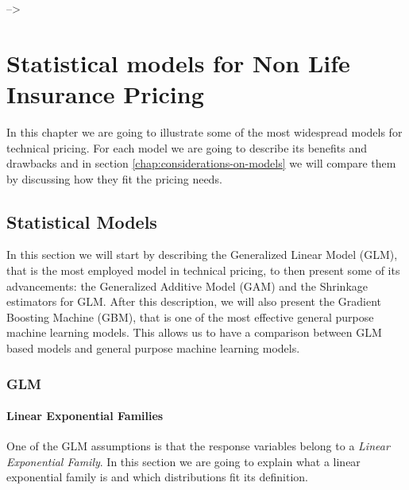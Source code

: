 \documentclass[a4paper, nobind]{templates/ociamthesis}
\theoremstyle{definition}
\theoremstyle{definition}
\theoremstyle{definition}
\theoremstyle{remark}
\begin{document}
--\textgreater{}

\hypertarget{chap:models}{%
\chapter{\texorpdfstring{\textbf{Statistical models for Non Life Insurance Pricing}}{Statistical models for Non Life Insurance Pricing}}\label{chap:models}}

\minitoc  


In this chapter we are going to illustrate some of the most widespread models for technical pricing. For each model we are going to describe its benefits and drawbacks and in section \ref{chap:considerations-on-models} we will compare them by discussing how they fit the pricing needs.

\hypertarget{statistical-models}{%
\section{Statistical Models}\label{statistical-models}}

In this section we will start by describing the Generalized Linear Model (GLM), that is the most employed model in technical pricing, to then present some of its advancements: the Generalized Additive Model (GAM) and the Shrinkage estimators for GLM. After this description, we will also present the Gradient Boosting Machine (GBM), that is one of the most effective general purpose machine learning models. This allows us to have a comparison between GLM based models and general purpose machine learning models.

\hypertarget{glm}{%
\subsection{GLM}\label{glm}}

\hypertarget{chap:linear-exp-families}{%
\subsubsection{Linear Exponential Families}\label{chap:linear-exp-families}}

One of the GLM assumptions is that the response variables belong to a \emph{Linear Exponential Family}. In this section we are going to explain what a linear exponential family is and which distributions fit its definition.
\end{document}

